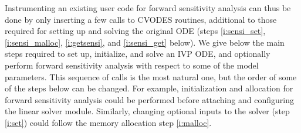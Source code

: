 Instrumenting an existing user code for forward sensitivity analysis can 
thus be done by only inserting a few calls to CVODES routines, additional
to those required for setting up and solving the original ODE
(steps \ref{i:sensi_set}, \ref{i:sensi_malloc}, \ref{i:getsensi}, 
and \ref{i:sensi_get} below).
We give below the main steps required to set up, initialize, and solve an 
IVP ODE, and optionally perform forward sensitivity analysis with respect 
to some of the model parameters. 
This sequence of calls is the most natural one, but the order of some of 
the steps below can be changed. 
For example, initialization and allocation for forward sensitivity analysis 
could be performed before attaching and configuring the linear solver module.
Similarly, changing optional inputs to the solver (step \ref{i:set}) could
follow the memory allocation step \ref{i:malloc}.
%
